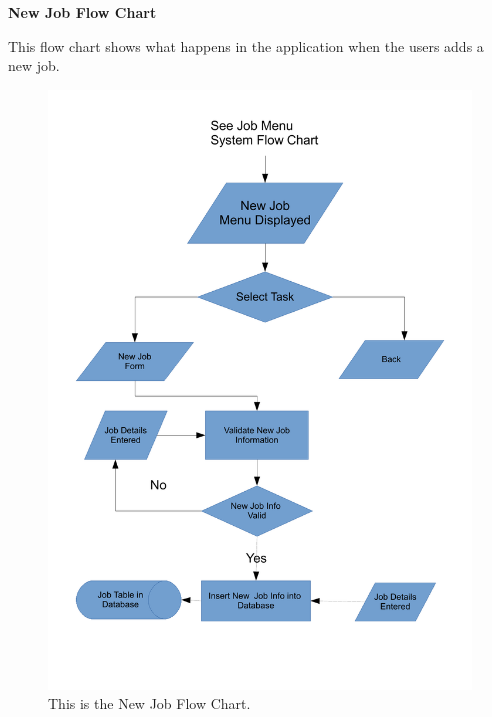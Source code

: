 \pagebreak
\textbf{New Job Flow Chart}
\begin{flushleft}
This flow chart shows what happens in the application when the users adds a new job.
\end{flushleft}
\begin{figure}[H]
\includegraphics[scale=0.5]{./Design/images/FlowChartNewJob.pdf}
    \caption{This is the New Job Flow Chart.} 
\label{fig:FlowChartNewJob}
\end{figure}


